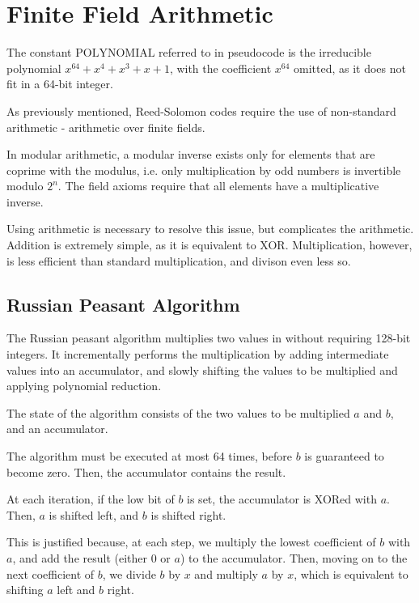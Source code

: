 \chapter{Finite Field Arithmetic}

The constant $\text{POLYNOMIAL}$ referred to in pseudocode is the irreducible polynomial $x^{64} + x^4 + x^3 + x + 1$,
with the coefficient $x^{64}$ omitted, as it does not fit in a 64-bit integer. \cite{low-weight-polynomials}

As previously mentioned, Reed-Solomon codes require the use of non-standard arithmetic - arithmetic over finite fields.

In modular arithmetic, a modular inverse exists only for elements that are coprime with the modulus, i.e. only multiplication by odd numbers is invertible modulo $2^n$.
The field axioms require that all elements have a multiplicative inverse.

Using  arithmetic is necessary to resolve this issue, but complicates the arithmetic.
Addition is extremely simple, as it is equivalent to XOR.
Multiplication, however, is less efficient than standard multiplication, and divison even less so.

\section{Russian Peasant Algorithm}

The Russian peasant algorithm multiplies two values in  without requiring 128-bit integers.
It incrementally performs the multiplication by adding intermediate values into an accumulator, and slowly shifting the values to be multiplied and applying polynomial reduction.

The state of the algorithm consists of the two values to be multiplied $a$ and $b$, and an accumulator.

The algorithm must be executed at most 64 times, before $b$ is guaranteed to become zero. Then, the accumulator contains the result.

At each iteration, if the low bit of $b$ is set, the accumulator is XORed with $a$.
Then, $a$ is shifted left, and $b$ is shifted right.

This is justified because, at each step, we multiply the lowest coefficient of $b$ with $a$, and add the result (either $0$ or $a$) to the accumulator.
Then, moving on to the next coefficient of $b$, we divide $b$ by $x$ and multiply $a$ by $x$, which is equivalent to shifting $a$ left and $b$ right.

